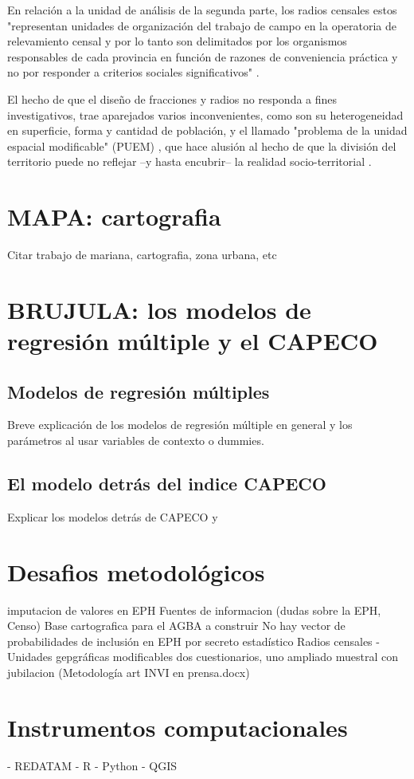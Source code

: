En relación a la unidad de análisis de la segunda parte, los radios censales estos "representan unidades de organización del trabajo de campo en la operatoria de relevamiento censal y por lo tanto son delimitados por los organismos responsables de cada provincia en función de razones de conveniencia práctica y no por responder a criterios sociales significativos" \cite[p~630]{robirosa} . 

El hecho de que el diseño de fracciones y radios no responda a fines investigativos, trae aparejados varios inconvenientes, como son su heterogeneidad en superficie, forma y cantidad de población, y el llamado "problema de la unidad espacial modificable" (PUEM) \cite{openshaw1977,openshaw1984}, que hace alusión al hecho de que la división del territorio puede no reflejar –y hasta encubrir– la realidad socio-territorial \cite{marcos2012}. 



	\section{MAPA: cartografia}\label{cap2-mapa}
	
	Citar trabajo de mariana, cartografia, zona urbana, etc
	
	\section{BRUJULA: los modelos de regresión múltiple y el CAPECO}\label{cap2-brujula}

	\subsection{Modelos de regresión múltiples}

Breve explicación de los modelos de regresión múltiple en general y los parámetros al usar variables de contexto o dummies.
	
	\subsection{El modelo detrás del indice CAPECO} \label{cap2-modeloCapeco}

	Explicar los modelos detrás de CAPECO y 




	\section{Desafios metodológicos}

imputacion de valores en EPH
Fuentes de informacion (dudas sobre la EPH, Censo)
Base cartografica para el AGBA a construir
No hay vector de probabilidades de inclusión en EPH por secreto estadístico
Radios censales - Unidades gepgráficas modificables
dos cuestionarios, uno ampliado muestral con jubilacion (Metodología art INVI en prensa.docx)
	
	\section{Instrumentos computacionales}
	- REDATAM
	- R
	- Python
	- QGIS